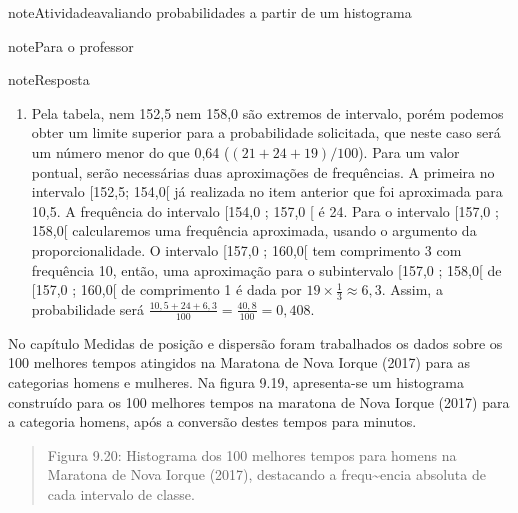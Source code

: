 \begin{sphinxadmonition}{note}{Atividade}{avaliando probabilidades a partir de um histograma}
\begin{sphinxadmonition}{note}{Para o professor}
\begin{sphinxadmonition}{note}{Resposta}
\begin{enumerate}
\item {} 
Pela tabela, nem 152,5 nem 158,0 são extremos de intervalo, porém podemos obter um limite  superior para a probabilidade solicitada, que neste caso será um número menor do que 0,64 (\((21+24+19)/100\)).  Para um valor pontual, serão necessárias duas aproximações de frequências. A primeira no intervalo {[}152,5; 154,0{[} já realizada no item anterior que foi aproximada para 10,5. A frequência do intervalo {[}154,0 ; 157,0 {[} é 24. Para o intervalo {[}157,0 ; 158,0{[} calcularemos uma frequência aproximada, usando o argumento da proporcionalidade. O intervalo {[}157,0 ; 160,0{[} tem comprimento 3 com frequência 10, então, uma aproximação para o subintervalo {[}157,0 ; 158,0{[} de {[}157,0 ; 160,0{[} de comprimento 1 é dada por \(19\times \frac{1}{3}\approx 6,3\). Assim, a probabilidade será \(\frac{10,5+24+6,3}{100}=\frac{40,8}{100}=0,408\).

\end{enumerate}
\end{sphinxadmonition}
\end{sphinxadmonition}
\end{sphinxadmonition}

No capítulo Medidas de posição e dispersão foram trabalhados os dados sobre os 100 melhores tempos atingidos na Maratona de Nova Iorque (2017) para as categorias homens e mulheres. Na figura 9.19, apresenta-se um histograma construído para os 100 melhores tempos na maratona de Nova Iorque (2017) para a categoria homens, após a conversão destes tempos para minutos.
\begin{quote}

\begin{figure}[H]
\centering

\noindent{}
\end{figure}

Figura 9.20: Histograma dos 100 melhores tempos para homens na Maratona de Nova Iorque (2017), destacando a frequ\textasciitilde{}encia absoluta de cada intervalo de classe.
\end{quote}

